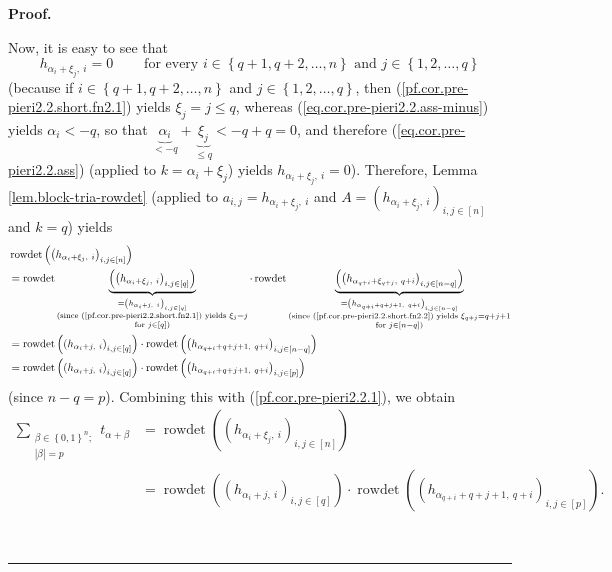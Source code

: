 \documentclass[numbers=enddot,12pt,final,onecolumn,notitlepage,english]{scrartcl}%
\theoremstyle{definition}
\newenvironment{proof}[1][Proof]{\noindent\textbf{#1.} }{\ \rule{0.5em}{0.5em}}
\let\sumnonlimits\sum
\renewcommand{\sum}{\sumnonlimits\limits}
\newenvironment{verlong}{}{}
\newenvironment{vershort}{}{}
\begin{document}
\begin{proof}
\begin{verlong}
\end{verlong}

\begin{vershort}
Now, it is easy to see that
\[
h_{\alpha_{i}+\xi_{j},\ i}=0\ \ \ \ \ \ \ \ \ \ \text{for every }i\in\left\{
q+1,q+2,\ldots,n\right\}  \text{ and }j\in\left\{  1,2,\ldots,q\right\}
\]
(because if $i\in\left\{  q+1,q+2,\ldots,n\right\}  $ and $j\in\left\{
1,2,\ldots,q\right\}  $, then (\ref{pf.cor.pre-pieri2.2.short.fn2.1}) yields
$\xi_{j}=j\leq q$, whereas (\ref{eq.cor.pre-pieri2.2.ass-minus}) yields
$\alpha_{i}<-q$, so that $\underbrace{\alpha_{i}}_{<-q}+\underbrace{\xi_{j}%
}_{\leq q}<-q+q=0$, and therefore (\ref{eq.cor.pre-pieri2.2.ass}) (applied to
$k=\alpha_{i}+\xi_{j}$) yields $h_{\alpha_{i}+\xi_{j},\ i}=0$). Therefore,
Lemma \ref{lem.block-tria-rowdet} (applied to $a_{i,j}=h_{\alpha_{i}+\xi
_{j},\ i}$ and $A=\left(  h_{\alpha_{i}+\xi_{j},\ i}\right)  _{i,j\in\left[
n\right]  }$ and $k=q$) yields%
\begin{align*}
&  \operatorname*{rowdet}\left(  \left(  h_{\alpha_{i}+\xi_{j},\ i}\right)
_{i,j\in\left[  n\right]  }\right) \\
&  =\operatorname*{rowdet}\underbrace{\left(  \left(  h_{\alpha_{i}+\xi
_{j},\ i}\right)  _{i,j\in\left[  q\right]  }\right)  }_{\substack{=\left(
h_{\alpha_{i}+j,\ i}\right)  _{i,j\in\left[  q\right]  }\\\text{(since
(\ref{pf.cor.pre-pieri2.2.short.fn2.1}) yields }\xi_{j}=j\\\text{for }%
j\in\left[  q\right]  \text{)}}}\cdot\operatorname*{rowdet}\underbrace{\left(
\left(  h_{\alpha_{q+i}+\xi_{q+j},\ q+i}\right)  _{i,j\in\left[  n-q\right]
}\right)  }_{\substack{=\left(  h_{\alpha_{q+i}+q+j+1,\ q+i}\right)
_{i,j\in\left[  n-q\right]  }\\\text{(since
(\ref{pf.cor.pre-pieri2.2.short.fn2.2}) yields }\xi_{q+j}=q+j+1\\\text{for
}j\in\left[  n-q\right]  \text{)}}}\\
&  =\operatorname*{rowdet}\left(  \left(  h_{\alpha_{i}+j,\ i}\right)
_{i,j\in\left[  q\right]  }\right)  \cdot\operatorname*{rowdet}\left(  \left(
h_{\alpha_{q+i}+q+j+1,\ q+i}\right)  _{i,j\in\left[  n-q\right]  }\right) \\
&  =\operatorname*{rowdet}\left(  \left(  h_{\alpha_{i}+j,\ i}\right)
_{i,j\in\left[  q\right]  }\right)  \cdot\operatorname*{rowdet}\left(  \left(
h_{\alpha_{q+i}+q+j+1,\ q+i}\right)  _{i,j\in\left[  p\right]  }\right)
\end{align*}
(since $n-q=p$). Combining this with (\ref{pf.cor.pre-pieri2.2.1}), we obtain%
\begin{align*}
\sum_{\substack{\beta\in\left\{  0,1\right\}  ^{n};\\\left\vert \beta
\right\vert =p}}t_{\alpha+\beta}  &  =\operatorname*{rowdet}\left(  \left(
h_{\alpha_{i}+\xi_{j},\ i}\right)  _{i,j\in\left[  n\right]  }\right) \\
&  =\operatorname*{rowdet}\left(  \left(  h_{\alpha_{i}+j,\ i}\right)
_{i,j\in\left[  q\right]  }\right)  \cdot\operatorname*{rowdet}\left(  \left(
h_{\alpha_{q+i}+q+j+1,\ q+i}\right)  _{i,j\in\left[  p\right]  }\right)  .
\end{align*}


\end{vershort}
\end{proof}
\end{document}
